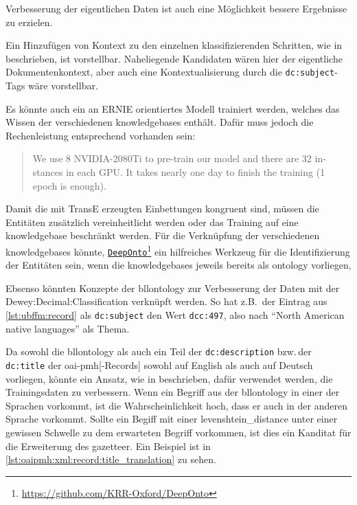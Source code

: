 Verbesserung der eigentlichen Daten ist auch eine Möglichkeit bessere Ergebnisse zu erzielen.

Ein Hinzufügen von Kontext zu den einzelnen klassifizierenden Schritten,
wie in  beschrieben,
ist vorstellbar.\autocite{2011.06993v1}
Naheliegende Kandidaten wären hier der eigentliche Dokumentenkontext,
aber auch eine Kontextualisierung durch die \texttt{dc:subject}-Tags
wäre vorstellbar.

Es könnte auch ein an \gls{ERNIE} 
orientiertes Modell trainiert werden,
welches das Wissen der verschiedenen \glspl{knowledgebase} enthält. \autocite{1905.07129}
Dafür muss jedoch die Rechenleistung entsprechend vorhanden sein:
\foreignblockquote{english}[\autocite{github:thunlp:ERNIE}]{We use 8 NVIDIA-2080Ti to pre-train our model and there are 32 instances in each GPU. It takes nearly one day to finish the training (1 epoch is enough).}
Damit die mit \gls{TransE} erzeugten Einbettungen
kongruent sind,
müssen die Entitäten zusätzlich vereinheitlicht werden
oder das Training auf eine \gls{knowledgebase} beschränkt werden.
Für die Verknüpfung der verschiedenen \glspl{knowledgebase}
könnte,
\href{https://github.com/KRR-Oxford/DeepOnto}{\texttt{DeepOnto}}\footnote{\url{https://github.com/KRR-Oxford/DeepOnto}}
ein hilfreiches Werkzeug für die Identifizierung der Entitäten sein,
wenn die \glspl{knowledgebase} jeweils bereits als \gls{ontology} vorliegen,


Ebsenso könnten Konzepte der \gls{bllontology}
zur Verbesserung der Daten
mit der \gls{Dewey:Decimal:Classification} verknüpft werden.
So hat z.B.\, der Eintrag  aus \cref{lst:ubffm:record} als \texttt{dc:subject} 
den Wert \texttt{dcc:497},
also nach \autocite{oclc:ddc23-summaries} \enquote{North American native languages}
als Thema.

Da sowohl die \gls{bllontology} 
als auch ein Teil der \texttt{dc:description} 
bzw.\,der \texttt{dc:title} der \gls{oai-pmh}[-Records]
sowohl auf English
als auch auf Deutsch vorliegen,
könnte ein Ansatz,
wie in 
beschrieben,
dafür verwendet werden,
die Trainingsdaten zu verbessern. \autocite{10.1145/2396761.2398506}
Wenn ein Begriff aus der \gls{bllontology} in einer der Sprachen vorkommt,
ist die Wahrscheinlichkeit hoch,
dass er auch in der anderen Sprache vorkommt.
Sollte ein Begiff mit einer \gls{levenshtein_distance} 
unter einer gewissen Schwelle
zu dem erwarteten Begriff
vorkommen,
ist dies ein Kanditat für die Erweiterung des \gls{gazetteer}.
Ein Beispiel ist in \cref{lst:oaipmh:xml:record:title_translation} zu sehen.

